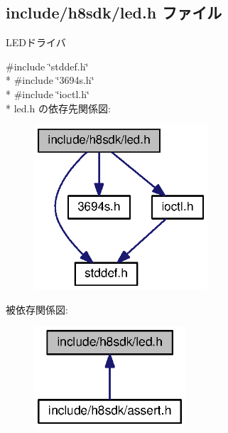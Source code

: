 \subsection{include/h8sdk/led.h ファイル}
\label{led_8h}


L\+E\+Dドライバ  


{\ttfamily \#include \char`\"{}stddef.\+h\char`\"{}}\\*
{\ttfamily \#include \char`\"{}3694s.\+h\char`\"{}}\\*
{\ttfamily \#include \char`\"{}ioctl.\+h\char`\"{}}\\*
led.\+h の依存先関係図\+:
\nopagebreak
\begin{figure}[H]
\begin{center}
\leavevmode
\includegraphics[width=183pt]{d6/d11/led_8h__incl}
\end{center}
\end{figure}
被依存関係図\+:
\nopagebreak
\begin{figure}[H]
\begin{center}
\leavevmode
\includegraphics[width=160pt]{d6/dde/led_8h__dep__incl}
\end{center}
\end{figure}
